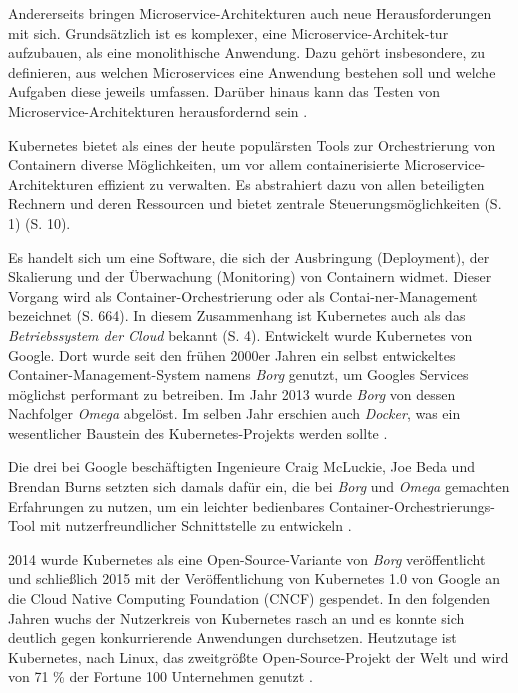 \documentclass[11pt,a4paper]{article}
\begin{document}
Andererseits bringen Microservice-Architekturen
auch neue Herausforderungen mit sich.
Grundsätzlich ist es komplexer, eine Microservice-Architek-\linebreak tur aufzubauen, als eine monolithische Anwendung.
Dazu gehört insbesondere, zu definieren, aus welchen Microservices eine Anwendung bestehen soll
und welche Aufgaben diese jeweils umfassen. Darüber hinaus kann das Testen von Microservice-Architekturen
herausfordernd sein \cite{8406008}.

Kubernetes bietet als eines der heute populärsten Tools zur Orchestrierung von Containern
diverse Möglichkeiten, um vor allem containerisierte Microservice-Architekturen effizient zu verwalten.
Es abstrahiert dazu von allen beteiligten Rechnern und deren Ressourcen und bietet zentrale Steuerungsmöglichkeiten
\cite{Schmeling_Dargatz_2022} (S. 1) \cite{cicd_with_kubernetes_devops} (S. 10).

Es handelt sich um eine Software, die sich der Ausbringung (Deployment),
der Skalierung und der Überwachung (Monitoring) von Containern widmet.
Dieser Vorgang wird als Container-Orchestrierung
oder als Contai-\linebreak ner-Management bezeichnet \cite{Bisong2019} (S. 664).
In diesem Zusammenhang ist Kubernetes auch als das \emph{Betriebssystem der Cloud} bekannt
\cite{Schmeling_Dargatz_2022} (S. 4).
Entwickelt wurde Kubernetes von Google. Dort wurde seit den frühen 2000er Jahren
ein selbst entwickeltes Container-Management-System namens \emph{Borg} \cite{43438} genutzt,
um Googles Services möglichst performant zu betreiben.
Im Jahr 2013 wurde \emph{Borg} von dessen Nachfolger \emph{Omega} abgelöst. Im selben Jahr erschien auch \emph{Docker},
was ein wesentlicher Baustein des Kubernetes-Projekts werden sollte \cite{ibm_history}.

Die drei bei Google beschäftigten Ingenieure Craig McLuckie, Joe Beda und Brendan Burns setzten sich damals dafür ein,
die bei \emph{Borg} und \emph{Omega} gemachten Erfahrungen zu nutzen, um ein leichter bedienbares Container-Orchestrierungs-Tool
mit nutzerfreundlicher Schnittstelle zu entwickeln \cite{ibm_history}.

2014 wurde Kubernetes als eine Open-Source-Variante von \emph{Borg} veröffentlicht
und schließlich 2015 mit der Veröffentlichung von Kubernetes 1.0
von Google an die Cloud Native Computing Foundation (CNCF) gespendet.
In den folgenden Jahren wuchs der Nutzerkreis von Kubernetes
rasch an und es konnte sich deutlich gegen konkurrierende Anwendungen durchsetzen.
Heutzutage ist Kubernetes, nach Linux, das zweitgrößte Open-Source-Projekt der Welt und wird von 71 \% der Fortune 100 Unternehmen genutzt
\cite{ibm_history} \cite{kubernetes_journey}.
\end{document}
